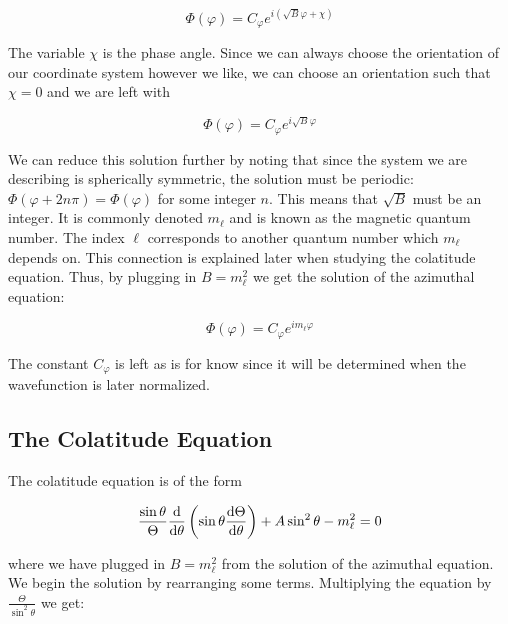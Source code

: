 \documentclass{article}
\begin{document}
    \begin{equation}
        \Phi(\varphi) = C_{\varphi}e^{i(\sqrt{B}\varphi + \chi)}
    \end{equation}

    The variable $\chi$ is the phase angle. Since we can always choose the orientation of our coordinate system however we like, we can choose an orientation such that $\chi = 0$
    and we are left with

    \begin{equation}
        \Phi(\varphi) = C_{\varphi}e^{i\sqrt{B}\varphi}
    \end{equation}

    We can reduce this solution further by noting that since the system we are describing is spherically symmetric, the solution must be periodic:
    $\Phi(\varphi + 2n\pi) = \Phi(\varphi)$ for some integer $n$. This means that $\sqrt{B}$ must be an integer. It is commonly denoted $m_{\ell}$ and is known
    as the magnetic quantum number. The index $\ell$ corresponds to another quantum number which $m_{\ell}$ depends on. This connection is explained later
    when studying the colatitude equation. Thus, by plugging in $B = m_{\ell}^2$ we get the solution of the azimuthal equation:

    \begin{equation}
        \label{eq:azimuth}
        \boxed{\Phi(\varphi) = C_{\varphi}e^{im_{\ell}\varphi}}
    \end{equation}

    The constant $C_{\varphi}$ is left as is for know since it will be determined when the wavefunction is later normalized.

    \subsection{The Colatitude Equation}

    The colatitude equation is of the form

    \begin{equation}
        \frac{\sin\theta}{\Theta}\odv{}{\theta}\left( \sin\theta\odv{\Theta}{\theta} \right) + A\sin^2\theta - m_{\ell}^2 = 0
    \end{equation}

    where we have plugged in $B = m_{\ell}^2$ from the solution of the azimuthal equation. We begin the solution by rearranging some terms. Multiplying the
    equation by $\frac{\Theta}{\sin^2\theta}$ we get: 
\end{document}
